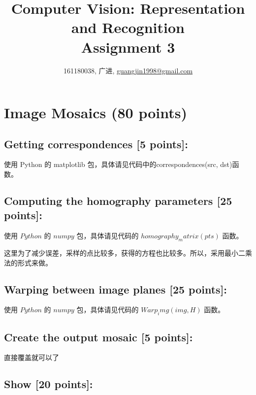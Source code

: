 \documentclass[a4paper,UTF8]{article}
\numberwithin{equation}{section}
\begin{document}
\title{Computer Vision: Representation and Recognition\\
Assignment 3}
\author{161180038, 广进, \href{mailto:guangjin1998@gmail.com}{guangjin1998@gmail.com}}
\maketitle

\section{ Image Mosaics (80 points)}

\subsection{Getting correspondences [5 points]:}
使用 Python 的 matplotlib 包，具体请见代码中的correspondences(src, dst)函数。

\subsection{Computing the homography parameters [25 points]:}
使用 $Python$ 的 $numpy$ 包，具体请见代码的 $homography_matrix(pts)$ 函数。\par
这里为了减少误差，采样的点比较多，获得的方程也比较多。所以，采用最小二乘法的形式来做。

\subsection{Warping between image planes [25 points]:}
使用 $Python$ 的 $numpy$ 包，具体请见代码的 $Warp_img(img, H)$ 函数。

\subsection{Create the output mosaic [5 points]:}
直接覆盖就可以了

\newpage
\subsection{Show [20 points]:}
\end{document}
